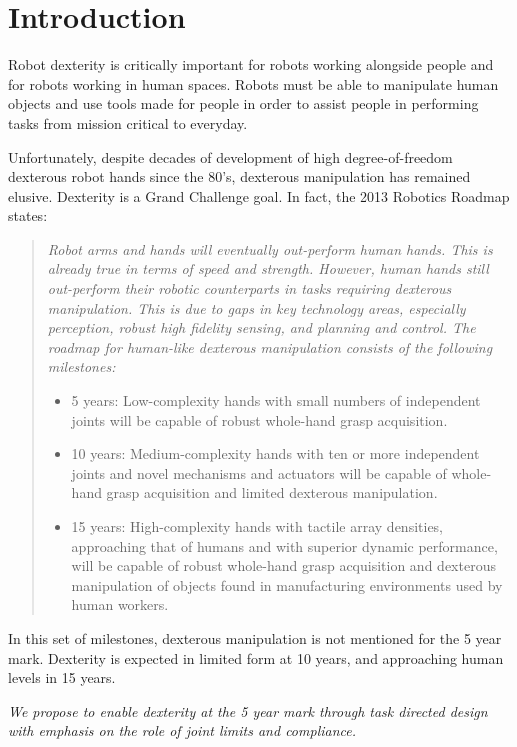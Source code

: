 \section{Introduction}

Robot dexterity is critically important for robots working alongside people and for robots working in human spaces.    Robots must be able to manipulate human objects and use tools made for people in order to assist people in performing tasks from mission critical to everyday.   

Unfortunately, despite decades of development of high degree-of-freedom dexterous robot hands since the 80's, dexterous manipulation has remained elusive.  Dexterity is a Grand Challenge goal.   In fact, the 2013 Robotics Roadmap \cite{christensen2009roadmap} states:
\begin{quotation}
{\small \it
Robot arms and hands will eventually out-perform human hands. This is already true in terms of speed and strength. However, human hands still out-perform their robotic counterparts in tasks requiring dexterous manipulation. This is due to gaps in key technology areas, especially perception, robust high fidelity sensing, and planning and control. The roadmap for human-like dexterous manipulation consists of the following milestones:
\begin{itemize}
	\item 5 years: Low-complexity hands with small numbers of independent joints will be capable of robust whole-hand grasp acquisition.
	\item 10 years: Medium-complexity hands with ten or more independent joints and novel mechanisms and actuators will be capable of whole-hand grasp acquisition and limited dexterous manipulation.
	\item 15 years: High-complexity hands with tactile array densities, approaching that of humans and with superior dynamic performance, will be capable of robust whole-hand grasp acquisition and dexterous manipulation of objects found in manufacturing environments used by human workers.
\end{itemize}}
\end{quotation}
In this set of milestones, dexterous manipulation is not mentioned for the 5 year mark.   Dexterity is expected in limited form at 10 years, and approaching human levels in 15 years.

{\it We propose to enable dexterity at the 5 year mark through task directed design with emphasis on the role of joint limits and compliance.}

